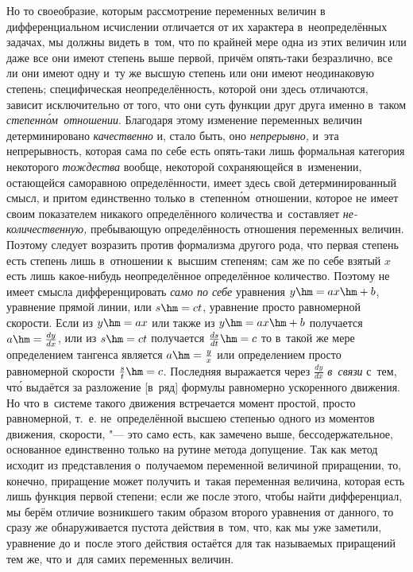 \label{bkm:bm53c}Но то своеобразие, которым рассмотрение переменных величин в
дифференциальном исчислении отличается от их характера в~неопределённых
задачах, мы должны видеть в~том, что по крайней мере одна из этих величин или
даже все они имеют степень выше первой, причём опять-таки безразлично, все ли
они имеют одну и~ту же высшую степень или они имеют неодинаковую степень;
специфическая неопределённость, которой они здесь отличаются, зависит
исключительно от того, что они суть функции друг друга именно в~таком
{\em степенн\'{о}м~отношении}. Благодаря этому изменение переменных величин
детерминировано {\em качественно} и, стало быть, оно {\em непрерывно,} и~эта
непрерывность, которая сама по себе есть опять-таки лишь формальная категория
некоторого {\em тождества} вообще, некоторой сохраняющейся в~изменении,
остающейся саморавною определённости, имеет здесь свой детерминированный смысл,
и притом единственно только в~степенн\'{о}м~отношении, которое не имеет своим
показателем никакого определённого количества и~составляет
{\em не-количественную,} пребывающую определённость отношения переменных
величин. Поэтому следует возразить против формализма другого рода, что первая
степень есть степень лишь в~отношении к~высшим степеням; сам же по себе взятый
$x$ есть лишь какое-нибудь неопределённое определённое количество. Поэтому
не имеет смысла дифференцировать {\em само по себе} уравнения $y\hm=ax\hm+b$,
уравнение прямой линии, или $s\hm=ct$, уравнение просто равномерной скорости.
Если из $y\hm=ax$ или также из $y\hm=ax\hm+b$ получается $a\hm=\frac{dy}{dx}$,
или из $s\hm=ct$ получается $\frac{ds}{dt}\hm=c$ то в~такой же мере
определением тангенса является $a\hm=\frac y x$ или определением просто
равномерной скорости $\frac s t\hm=c$. Последняя выражается через
$\frac{dy}{dx}$ {\em в~связи} с~тем, чт\'{о} выдаётся за разложение [в~ряд]
формулы равномерно ускоренного движения. Но что в~системе такого движения
встречается момент простой, просто равномерной, т.~е. не~определённой высшею
степенью одного из моментов движения, скорости, "--- это само есть, как
замечено выше, бессодержательное, основанное единственно только на рутине
метода допущение. Так как метод исходит из представления о~получаемом
переменной величиной приращении, то, конечно, приращение может получить и~такая
переменная величина, которая есть лишь функция первой степени; если же после
этого, чтобы найти дифференциал, мы берём отличие возникшего таким образом
второго уравнения от данного, то сразу же обнаруживается пустота действия
в~том, что, как мы уже заметили, уравнение до и~после этого действия остаётся
для так называемых приращений тем же, что и~для самих переменных величин.

